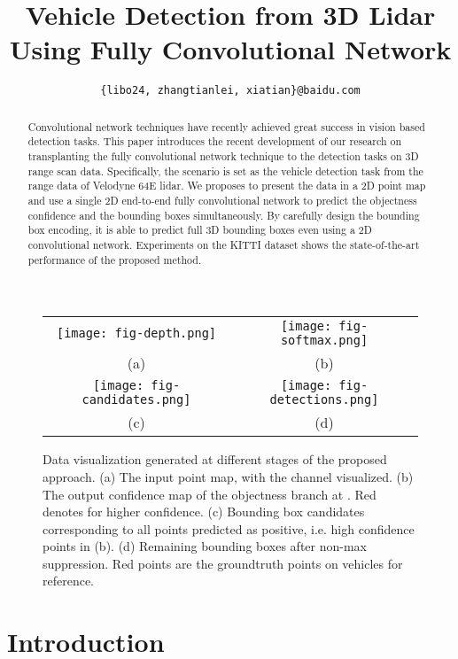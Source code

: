 \documentclass[conference]{IEEEtran}
\title{Vehicle Detection from 3D Lidar Using Fully Convolutional Network}
\author{
\IEEEauthorblockN{Bo Li, Tianlei Zhang and Tian Xia}
\IEEEauthorblockA{Baidu Research – Institute for Deep Learning}
\texttt{\{libo24, zhangtianlei, xiatian\}@baidu.com}}
\begin{document}
\maketitle

\begin{abstract}
Convolutional network techniques have recently achieved great success in vision based detection tasks. This paper introduces the recent development of our research on transplanting the fully convolutional network technique to the detection tasks on 3D range scan data. Specifically, the scenario is set as the vehicle detection task from the range data of Velodyne 64E lidar. We proposes to present the data in a 2D point map and use a single 2D end-to-end fully convolutional network to predict the objectness confidence and the bounding boxes simultaneously. By carefully design the bounding box encoding, it is able to predict full 3D bounding boxes even using a 2D convolutional network. Experiments on the KITTI dataset shows the state-of-the-art performance of the proposed method. 
\end{abstract}

\begin{figure*}
\centering
\begin{tabular}{cc}
\texttt{[image: fig-depth.png]} & \texttt{[image: fig-softmax.png]} \\
(a) & (b) \\
\texttt{[image: fig-candidates.png]} & \texttt{[image: fig-detections.png]} \\
(c) & (d)
\end{tabular}

\caption{Data visualization generated at different stages of the proposed approach. (a) The input point map, with the  channel visualized. (b) The output confidence map of the objectness branch at . Red denotes for higher confidence. (c) Bounding box candidates corresponding to all points predicted as positive, i.e. high confidence points in (b). (d) Remaining bounding boxes after non-max suppression. Red points are the groundtruth points on vehicles for reference. }
\label{fig:pipeline}
\end{figure*}

\section{Introduction}
\end{document}

